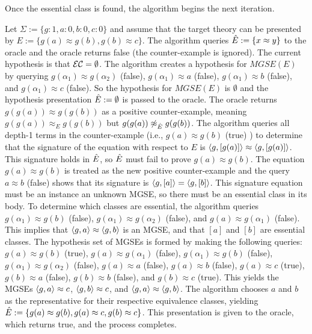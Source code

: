 Once the essential class is found, the algorithm begins the next iteration.

 
\begin{example} 
Let $\Sigma := \{ g:1, a:0, b:0, c:0 \}$ and assume that the target theory can be presented by $E := \{ g(a)\approx g(b), g(b) \approx c \}$.
The algorithm queries $\ahat{E}  := \{ x \approx y \}$ to the oracle and the oracle returns false (the counter-example is ignored).
The current hypothesis is that ${\mathcal{E}\mathcal{C}} = \emptyset$.
The algorithm creates a hypothesis for $MGSE(E)$ by querying $g(\alpha_1)\approx g(\alpha_2)$ (false), $g(\alpha_1)\approx a$ (false), $g(\alpha_1)\approx b$ (false), and $g(\alpha_1)\approx c$ (false). 
So the hypothesis for $MGSE(E)$ is $\emptyset$ and the hypothesis presentation $\ahat{E} := \emptyset$ is passed to the oracle. 
The oracle returns $g(g(a)) \approx g(g(b))$ as a positive counter-example, meaning $g(g(a)) \approx_E g(g(b))$ but $g(g(a)) \not\approx_{\ahat{E}} g(g(b))$.
The algorithm queries all depth-1 terms in the counter-example (i.e., $g(a)\approx g(b)$ (true) ) to determine that the signature of the equation with respect to $E$ is $\langle g, [g(a)] \rangle \approx \langle g, [g(a)] \rangle$.
This signature holds in $\ahat{E} $, so $\ahat{E} $ must fail to prove $g(a) \approx g(b)$.
The equation $g(a) \approx g(b)$ is treated as the new positive counter-example and the query $a \approx b$ (false) shows that its signature is $\langle g, [a] \rangle = \langle g, [b] \rangle$. 
This signature equation must be an instance an unknown MGSE, so there must be an essential class in its body. 
To determine which classes are essential, the algorithm queries $g(\alpha_1)\approx g(b)$ (false), $g(\alpha_1)\approx g(\alpha_2)$ (false), and $g(a)\approx g(\alpha_1)$ (false).
This implies that $\langle g, a \rangle \approx \langle g,b \rangle$ is an MGSE, and that $[a]$ and $[b]$ are essential classes. 
The hypothesis set of MGSEs is formed by making the following queries: $g(a) \approx g(b)$ (true), $g(a) \approx g(\alpha_1)$ (false), $g(\alpha_1) \approx g(b)$ (false), $g(\alpha_1) \approx g(\alpha_2)$ (false), $g(a) \approx a$ (false), $g(a) \approx b$ (false), $g(a) \approx c$ (true), $g(b) \approx a$ (false), $g(b) \approx b$ (false), and $g(b) \approx c$ (true). 
This yields the MGSEs $\langle g, a \rangle \approx c$, $\langle g, b \rangle \approx c$, and $\langle g, a \rangle \approx \langle g,b \rangle$.
The algorithm chooses $a$ and $b$ as the representative for their respective equivalence classes, yielding $\ahat{E}  := \{ g(a)\approx g(b), g(a) \approx c, g(b) \approx c\}$.
This presentation is given to the oracle, which returns true, and the process completes. 
\end{example}


